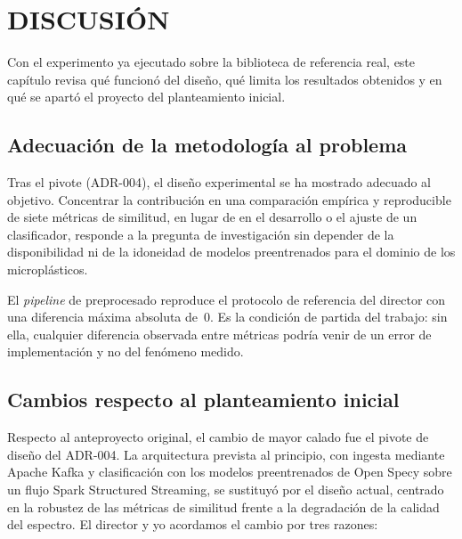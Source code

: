 \chapter{DISCUSIÓN}

Con el experimento ya ejecutado sobre la biblioteca de referencia real, este capítulo revisa qué funcionó del diseño, qué limita los resultados obtenidos y en qué se apartó el proyecto del planteamiento inicial.

\section{Adecuación de la metodología al problema}

Tras el pivote (ADR-004), el diseño experimental se ha mostrado adecuado al objetivo. Concentrar la contribución en una comparación empírica y reproducible de siete métricas de similitud, en lugar de en el desarrollo o el ajuste de un clasificador, responde a la pregunta de investigación sin depender de la disponibilidad ni de la idoneidad de modelos preentrenados para el dominio de los microplásticos.

El \textit{pipeline} de preprocesado reproduce el protocolo de referencia del director con una diferencia máxima absoluta de~0. Es la condición de partida del trabajo: sin ella, cualquier diferencia observada entre métricas podría venir de un error de implementación y no del fenómeno medido.

\section{Cambios respecto al planteamiento inicial}

Respecto al anteproyecto original, el cambio de mayor calado fue el pivote de diseño del ADR-004. La arquitectura prevista al principio, con ingesta mediante Apache Kafka y clasificación con los modelos preentrenados de Open Specy sobre un flujo Spark Structured Streaming, se sustituyó por el diseño actual, centrado en la robustez de las métricas de similitud frente a la degradación de la calidad del espectro. El director y yo acordamos el cambio por tres razones:

